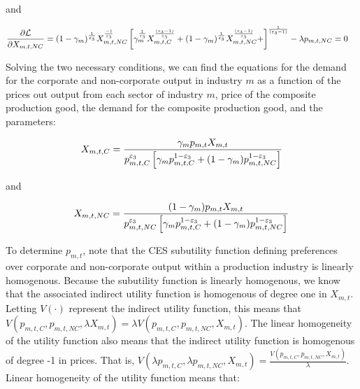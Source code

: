    and
   
\begin{equation} \label{eqn:comp_output_foc_NC}
	\begin{split}
       	&  \frac{\partial \mathcal{L}}{\partial X_{m,t,NC}} = (1-\gamma_{m})^{\frac{1}{\varepsilon_{3}}} X_{m,t,NC}^{\frac{-1}{\varepsilon_{3}}} \left[\gamma_{m}^{\frac{1}{\varepsilon_{3}}}X_{m,t,C}^{\frac{(\varepsilon_{3}-1)}{\varepsilon_{3}}}+(1-\gamma_{m})^{\frac{1}{\varepsilon_{3}}}X_{m,t,NC}^{\frac{(\varepsilon_{3}-1)}{\varepsilon_{3}}}+\right]^{\frac{1}{(\varepsilon_{3}-1)}} - \lambda p_{m,t,NC} = 0
	\end{split}
\end{equation}
    
    Solving the two necessary conditions, we can find the equations for the demand for the corporate and non-corporate output in industry $m$ as a function of the prices out output from each sector of industry $m$, price of the composite production good, the demand for the composite production good, and the parameters:
    
\begin{equation} \label{eqn:demand_XmtC}
	X_{m,t,C} = \frac{\gamma_{m}p_{m,t}X_{m,t}}{p_{m,t,C}^{\varepsilon_{3}}\left[\gamma_{m}p_{m,t,C}^{1-\varepsilon_{3}}+(1-\gamma_{m})p_{m,t,NC}^{1-\varepsilon_{3}}\right]}
\end{equation}
    
    and 
    
    \begin{equation} \label{eqn:demand_XmtNC}
	X_{m,t,NC} = \frac{(1-\gamma_{m})p_{m,t}X_{m,t}}{p_{m,t,NC}^{\varepsilon_{3}}\left[\gamma_{m}p_{m,t,C}^{1-\varepsilon_{3}}+(1-\gamma_{m})p_{m,t,NC}^{1-\varepsilon_{3}}\right]}
\end{equation}

To determine $p_{m,t}$, note that the CES subutility function defining preferences over corporate and non-corporate output within a production industry is linearly homogenous.  Because the subutility function is linearly homogenous, we know that the associated indirect utility function is homogenous of degree one in $X_{m,t}$.  Letting $V(\cdot)$ represent the indirect utility function, this means that $V(p_{m,t,C},p_{m,t,NC},\lambda X_{m,t}) = \lambda V(p_{m,t,C},p_{m,t,NC}, X_{m,t})$.  The linear homogeneity of the utility function also means that the indirect utility function is homogenous of degree -1 in prices.  That is, $V(\lambda p_{m,t,C},\lambda p_{m,t,NC}, X_{m,t}) = \frac{V(p_{m,t,C},p_{m,t,NC}, X_{m,t})}{\lambda}$. Linear homogeneity of the utility function means that: 

